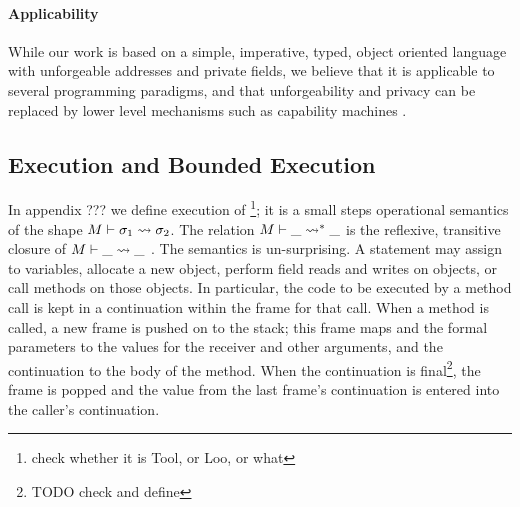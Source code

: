 \paragraph{Applicability} 
While our work is based on a simple, imperative, typed, object oriented  language with unforgeable addresses and private fields, we believe that %
 it is applicable to several programming paradigms, and  that   unforgeability and privacy
 can be replaced  by lower level mechanisms such as capability machines \cite{vanproving,davis2019cheriabi}.
  
\subsection{Execution and Bounded Execution}
 
In appendix ??? we  define execution  of \Loo\footnote{check whether it is Tool, or Loo, or what};
 it is a small steps operational semantics of the shape $M \vdash \sigma_1 \leadsto {\sigma_2}$. 
 The relation $M \vdash \_ \leadsto^* {\_}$  is the reflexive, transitive closure of $M \vdash \_ \leadsto {\_}$ .
The semantics is un-surprising. 
 A statement may assign to variables, allocate a new object, 
perform field reads and writes on objects,  or
 call methods on those objects. 
In particular, the code to be executed by a method call is kept in a continuation within the frame for that call. When a method is called, a new frame is pushed on to the stack; this frame  maps  and the formal parameters to  the values for the receiver and other arguments, and the continuation to the body of the method.  When the continuation is final\footnote{TODO check and define}, the frame is popped and the value from the last frame's continuation is entered into the caller's continuation. 


